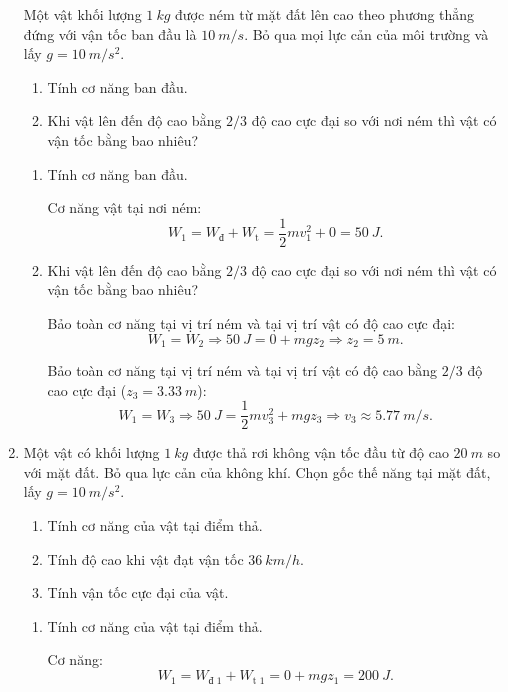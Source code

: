 \begin{enumerate}[label=\bfseries Câu \arabic*:]
	
	{
		Một vật khối lượng $\SI{1}{kg}$ được ném từ mặt đất lên cao theo phương thẳng đứng với vận tốc ban đầu là $\SI{10}{m/s}$. Bỏ qua mọi lực cản của môi trường và lấy $g=\SI{10}{m/s^2}$.
		\begin{enumerate}[label=\alph*)]
			\item Tính cơ năng ban đầu.
			\item Khi vật lên đến độ cao bằng $2/3$ độ cao cực đại so với nơi ném thì vật có vận tốc bằng bao nhiêu?
		\end{enumerate}
	}
	
	\hideall
	{	
		
		\begin{enumerate}[label=\alph*)]
			\item Tính cơ năng ban đầu.
			
			Cơ năng vật tại nơi ném:
			$$W_1=W_\text{đ} + W_\text{t} = \dfrac{1}{2}mv_1^2 + 0 = \SI{50}{J}.$$
			\item Khi vật lên đến độ cao bằng $2/3$ độ cao cực đại so với nơi ném thì vật có vận tốc bằng bao nhiêu?
			
			Bảo toàn cơ năng tại vị trí ném và tại vị trí vật có độ cao cực đại:
			$$W_1 = W_2 \Rightarrow \SI{50}{J} = 0 + mgz_2 \Rightarrow z_2 = \SI{5}{m}.$$
			
			Bảo toàn cơ năng tại vị trí ném và tại vị trí vật có độ cao bằng $2/3$ độ cao cực đại ($z_3=\SI{3.33}{m}$):
			$$W_1 = W_3 \Rightarrow \SI{50}{J} = \dfrac{1}{2}mv_3^2 + mgz_3 \Rightarrow v_3 \approx \SI{5.77}{m/s}.$$
		\end{enumerate}
	}
	\item {}
	
	
	{
		Một vật có khối lượng $\SI{1}{kg}$ được thả rơi không vận tốc đầu từ độ cao $\SI{20}{m}$ so với mặt đất. Bỏ qua lực cản của không khí. Chọn gốc thế năng tại mặt đất, lấy $g=\SI{10}{m/s^2}$.
		\begin{enumerate}[label=\alph*)]
			\item Tính cơ năng của vật tại điểm thả.
			\item Tính độ cao khi vật đạt vận tốc $\SI{36}{km/h}$.
			\item Tính vận tốc cực đại của vật.
		\end{enumerate}
	}
	
	\hideall
	{	
			\begin{enumerate}[label=\alph*)]
			\item Tính cơ năng của vật tại điểm thả.
			
			Cơ năng:
			$$W_1 = W_\text{đ 1} + W_\text{t 1} = 0 + mgz_1 = \SI{200}{J}.$$
			

\end{enumerate}}
\end{enumerate}
